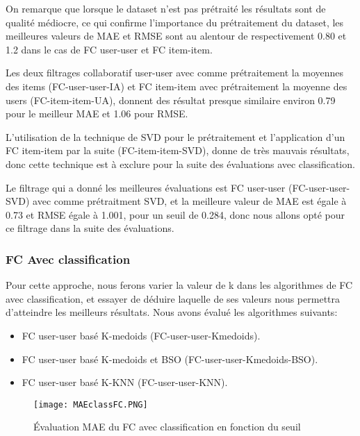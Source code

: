 On remarque que lorsque le dataset n'est pas prétraité les résultats sont de qualité médiocre, ce qui confirme l'importance du prétraitement du dataset, les meilleures valeurs de MAE et RMSE sont au alentour de respectivement 0.80 et 1.2 dans le cas de FC user-user et FC item-item.

Les deux filtrages collaboratif user-user avec comme prétraitement la moyennes des items (FC-user-user-IA) et FC item-item avec  prétraitement la moyenne des users (FC-item-item-UA), donnent des résultat presque similaire environ  0.79 pour le meilleur MAE et 1.06 pour RMSE.
 
L'utilisation de la technique de SVD pour le prétraitement et l'application d'un FC item-item  par la suite (FC-item-item-SVD), donne de très mauvais résultats, donc cette technique est à exclure pour la suite des évaluations avec classification.

Le filtrage qui a donné les meilleures évaluations est FC user-user (FC-user-user-SVD) avec comme prétraitment SVD, et la meilleure valeur de MAE est égale à 0.73 et RMSE égale à 1.001, pour un seuil de 0.284, donc nous allons opté pour ce filtrage dans la suite des évaluations.

\subsubsection*{FC Avec classification}
Pour cette approche, nous ferons varier la valeur de k dans les algorithmes de FC avec classification, et essayer de déduire laquelle de ses valeurs nous permettra d’atteindre les meilleurs résultats.
Nous avons évalué les algorithmes suivants:
\begin{itemize}
	\item  FC user-user basé K-medoids (FC-user-user-Kmedoids).
	\item  FC user-user basé K-medoids et BSO (FC-user-user-Kmedoids-BSO).
	\item  FC user-user basé K-KNN (FC-user-user-KNN).
\end{itemize}

\begin{figure}[H]
		\centering
	\texttt{[image: MAEclassFC.PNG]}
	\caption{Évaluation MAE du FC avec classification en fonction du seuil}
	\label{fig:MAEclassFC}
\end{figure}


